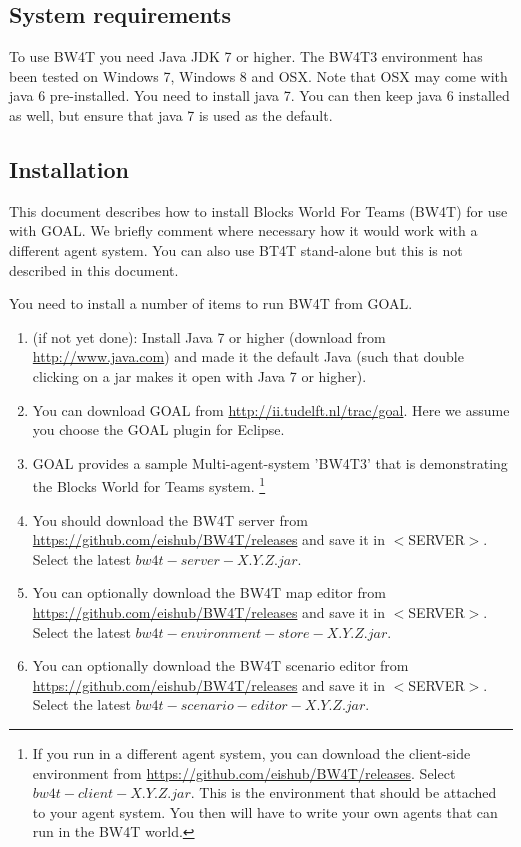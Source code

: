 \documentclass[11pt,a4paper]{article}
\begin{document}
\subsection{System requirements}
To use BW4T you need Java JDK 7 or higher. The BW4T3 environment has been tested on Windows 7, Windows 8 and OSX. Note that OSX may come with java 6 pre-installed. You need to install java 7. You can then keep java 6 installed as well, but ensure that java 7 is used as the default.

\subsection{Installation}
This document describes how to install Blocks World For Teams (BW4T) for use with GOAL. We briefly comment where necessary how it would work with a different agent system. You can also use BT4T stand-alone but this is not described in this document. 

You need to install a number of items to run BW4T from GOAL. 
\begin{enumerate}
 \item (if not yet done): Install Java 7 or higher (download from \url{http://www.java.com}) and made it the default Java (such that double clicking on a jar makes it open with Java 7 or higher).
 \item You can download GOAL from \url{http://ii.tudelft.nl/trac/goal}. Here we assume you choose the GOAL plugin for Eclipse.
 \item GOAL provides a sample Multi-agent-system 'BW4T3' that is demonstrating the Blocks World for Teams system. \footnote{If you run in a different agent system, you can download the client-side environment from \url{https://github.com/eishub/BW4T/releases}. Select $bw4t-client-X.Y.Z.jar$. This is the environment that should be attached to your agent system. You then will have to write your own agents that can run in the BW4T world.}
 \item You should download the BW4T server from \url{https://github.com/eishub/BW4T/releases} and save it in $<$SERVER$>$. Select the latest $bw4t-server-X.Y.Z.jar$.
 \item You can optionally download the BW4T map editor from \url{https://github.com/eishub/BW4T/releases} and save it in $<$SERVER$>$. Select the latest $bw4t-environment-store-X.Y.Z.jar$.
 \item You can optionally download the BW4T scenario editor from \url{https://github.com/eishub/BW4T/releases} and save it in $<$SERVER$>$. Select the latest $bw4t-scenario-editor-X.Y.Z.jar$.
\end{enumerate}
  
\end{document}
